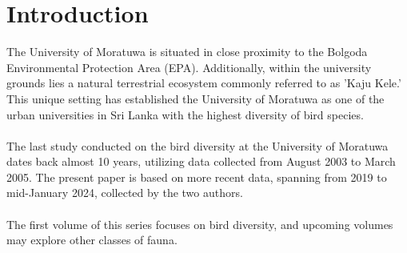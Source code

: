 \chapter{Introduction}
\label{cp:introduction}
The University of Moratuwa is situated in close proximity to the Bolgoda Environmental Protection Area (EPA). Additionally, within the university grounds lies a natural terrestrial ecosystem commonly referred to as 'Kaju Kele.' This unique setting has established the University of Moratuwa as one of the urban universities in Sri Lanka with the highest diversity of bird species.
\\\\
The last study conducted on the bird diversity at the University of Moratuwa dates back almost 10 years, utilizing data collected from August 2003 to March 2005. The present paper is based on more recent data, spanning from 2019 to mid-January 2024, collected by the two authors.
\\\\
The first volume of this series focuses on bird diversity, and upcoming volumes may explore other classes of fauna.
